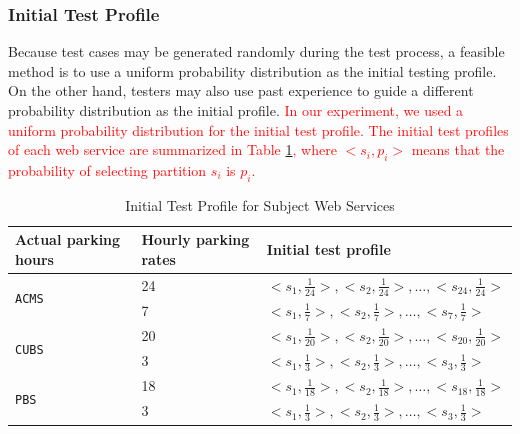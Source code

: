 \documentclass[10pt,journal,compsoc]{IEEEtran}
\begin{document}
\subsubsection{Initial Test Profile}
\label{sec:profile}

Because test cases may be generated randomly during the test process, a feasible method is to use a uniform probability distribution as the initial testing profile.
On the other hand, testers may also use past experience to guide a different probability distribution as the initial profile. \textcolor{red}{In our experiment, we used a uniform probability distribution for the initial test profile. The initial test
profiles of each web service are summarized in Table \ref{tab:initialtf}, where $<s_i, p_i>$
means that the probability of selecting partition $s_i$ is $p_i$.}

\begin{table}
  \caption{Initial Test Profile for Subject Web Services}
  \label{tab:initialtf}
  \centering
  \begin{tabular}{lll} \toprule
  Actual parking hours                &Hourly parking rates   & Initial test profile  \\ \midrule
  \multirow{2}{*}{\texttt{ACMS}}      &24                     &${<s_1, \frac{1}{24}>, <s_2, \frac{1}{24}>,\ldots, <s_{24}, \frac{1}{24}>}$  \\
                             &7                     &${<s_1, \frac{1}{7}>, <s_2, \frac{1}{7}>, \ldots,<s_7, \frac{1}{7}>}$  \\ \midrule
  \multirow{2}{*}{\texttt{CUBS}}      &20                     &${<s_1, \frac{1}{20}>, <s_2, \frac{1}{20}>,\ldots, <s_{20}, \frac{1}{20}>}$  \\
                             &3                     &${<s_1, \frac{1}{3}>, <s_2, \frac{1}{3}>, \ldots,<s_3, \frac{1}{3}>}$  \\ \midrule
  \multirow{2}{*}{\texttt{PBS}}       &18                     &${<s_1, \frac{1}{18}>, <s_2, \frac{1}{18}>,\ldots, <s_{18}, \frac{1}{18}>}$  \\
                             &3                     &${<s_1, \frac{1}{3}>, <s_2, \frac{1}{3}>, \ldots,<s_3, \frac{1}{3}>}$  \\ \bottomrule


  \end{tabular}
\end{table}
\end{document}
